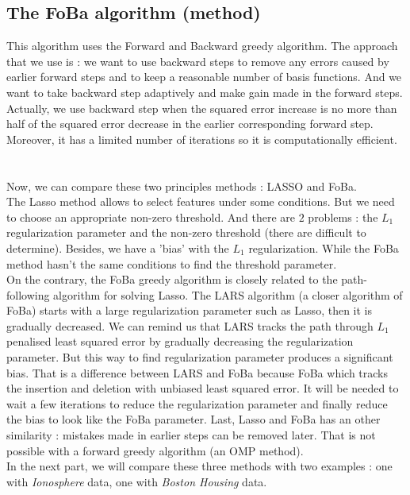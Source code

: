 \documentclass{article}
\begin{document}
\subsection{The FoBa algorithm (method)}
This algorithm uses the Forward and Backward greedy algorithm. The approach that we use is : we want to use backward steps to remove any errors caused by earlier forward steps and to keep a reasonable number of basis functions. And we want to take backward step adaptively and make gain made in the forward steps. Actually, we use backward step when the squared error increase is no more than half of the squared error decrease in the earlier corresponding forward step. Moreover, it has a limited number of iterations so it is computationally efficient. \\
\\
\\
Now, we can compare these two principles methods : LASSO and FoBa.\\
The Lasso method allows to select features under some conditions. But we need to choose an appropriate non-zero threshold. And there are $2$ problems : the $L_1$ regularization parameter and the non-zero threshold (there are difficult to determine). Besides, we have a 'bias' with the $L_1$ regularization. While the FoBa method hasn't the same conditions to find the threshold parameter.\\
On the contrary, the FoBa greedy algorithm is closely related to the path-following algorithm for solving Lasso. The LARS algorithm (a closer algorithm of FoBa) starts with a large regularization parameter such as Lasso, then it is gradually decreased. We can remind us that LARS tracks the path through $L_1$ penalised least squared error by gradually decreasing the regularization parameter. But this way to find regularization parameter produces a significant bias. That is a difference between LARS and FoBa because FoBa which tracks the insertion and deletion with unbiased least squared error. It will be needed to wait a few iterations to reduce the regularization parameter and finally reduce the bias to look like the FoBa parameter. Last, Lasso and FoBa has an other similarity : mistakes made in earlier steps can be removed later. That is not possible with a forward greedy algorithm (an OMP method).\\

In the next part, we will compare these three methods with two examples : one with \textit{Ionosphere} data, one with \textit{Boston Housing} data.
\end{document}

